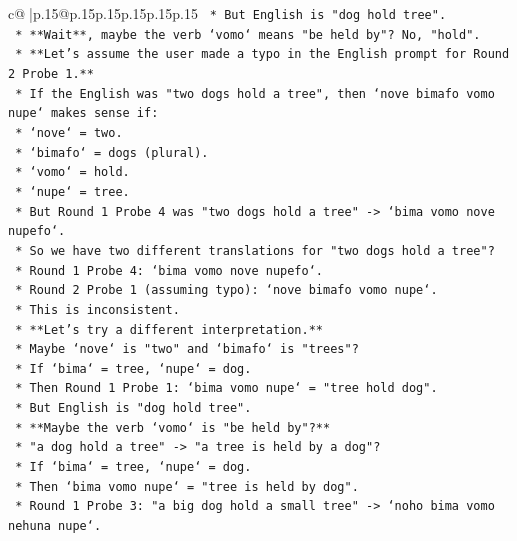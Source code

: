 \documentclass{article}
\begin{document}
{\begin{supertabular}{c@{$\;$}|p{.15\linewidth}@{}p{.15\linewidth}p{.15\linewidth}p{.15\linewidth}p{.15\linewidth}p{.15\linewidth}}
{{{\texttt{                *   But English is "dog hold tree".} \\
\texttt{                *   **Wait**, maybe the verb `vomo` means "be held by"? No, "hold".} \\
\texttt{            *   **Let's assume the user made a typo in the English prompt for Round 2 Probe 1.**} \\
\texttt{            *   If the English was "two dogs hold a tree", then `nove bimafo vomo nupe` makes sense if:} \\
\texttt{                *   `nove` = two.} \\
\texttt{                *   `bimafo` = dogs (plural).} \\
\texttt{                *   `vomo` = hold.} \\
\texttt{                *   `nupe` = tree.} \\
\texttt{            *   But Round 1 Probe 4 was "two dogs hold a tree" {-}> `bima vomo nove nupefo`.} \\
\texttt{            *   So we have two different translations for "two dogs hold a tree"?} \\
\texttt{            *   Round 1 Probe 4: `bima vomo nove nupefo`.} \\
\texttt{            *   Round 2 Probe 1 (assuming typo): `nove bimafo vomo nupe`.} \\
\texttt{            *   This is inconsistent.} \\
\texttt{            *   **Let's try a different interpretation.**} \\
\texttt{            *   Maybe `nove` is "two" and `bimafo` is "trees"?} \\
\texttt{            *   If `bima` = tree, `nupe` = dog.} \\
\texttt{            *   Then Round 1 Probe 1: `bima vomo nupe` = "tree hold dog".} \\
\texttt{            *   But English is "dog hold tree".} \\
\texttt{            *   **Maybe the verb `vomo` is "be held by"?**} \\
\texttt{            *   "a dog hold a tree" {-}> "a tree is held by a dog"?} \\
\texttt{            *   If `bima` = tree, `nupe` = dog.} \\
\texttt{            *   Then `bima vomo nupe` = "tree is held by dog".} \\
\texttt{            *   Round 1 Probe 3: "a big dog hold a small tree" {-}> `noho bima vomo nehuna nupe`.} \\
}}}
\end{supertabular}}
\end{document}
